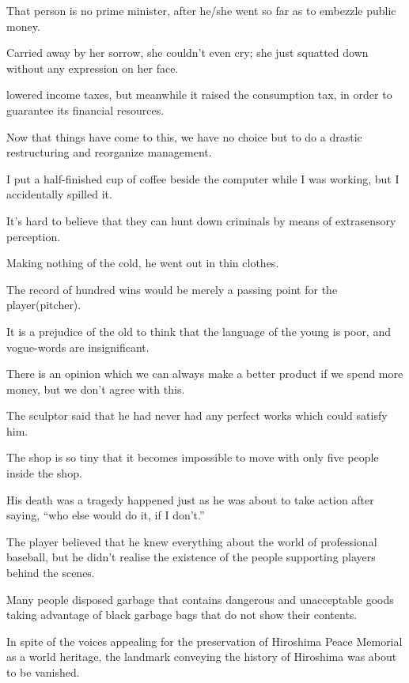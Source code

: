 \item[195.] That person is no prime minister, after he/she went so far as to embezzle public money.
\item[196.] Carried away by her sorrow, she couldn't even cry; she just squatted down without any expression on her face.
\item[197.] [The government] lowered income taxes, but meanwhile it raised the consumption tax, in order to guarantee its financial resources.
\item[198.] Now that things have come to this, we have no choice but to do a drastic restructuring and reorganize management.
\item[199.] I put a half-finished cup of coffee beside the computer while I was working, but I accidentally spilled it.
\item[200.] It's hard to believe that they can hunt down criminals by means of extrasensory perception.
\item[201.] Making nothing of the cold, he went out in thin clothes.
\item[202.] The record of hundred wins would be merely a passing point for the player(pitcher).
\item[203.] It is a prejudice of the old to think that the language of the young is poor, and vogue-words are insignificant.
\item[204.] There is an opinion which we can always make a better product if we spend more money, but we don't agree with this.
\item[205.] The sculptor said that he had never had any perfect works which could satisfy him.
\item[206.] The shop is so tiny that it becomes impossible to move with only five people inside the shop.
\item[207.] His death was a tragedy happened just as he was about to take action after saying, ``who else would do it, if I don't.''
\item[208.] The player believed that he knew everything about the world of professional baseball, but he didn't realise the existence of the people supporting players behind the scenes.
\item[209.] Many people disposed garbage that contains dangerous and unacceptable goods taking advantage of black garbage bags that do not show their contents.
\item[210.] In spite of the voices appealing for the preservation of Hiroshima Peace Memorial as a world heritage, the landmark conveying the history of Hiroshima was about to be vanished.
